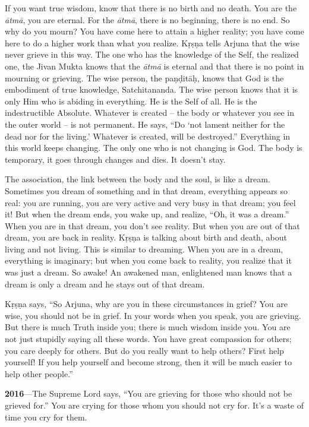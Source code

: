 If you want true wisdom, know that there is no birth and no death. You are the \textit{ātmā}, you are eternal. For the \textit{ātmā}, there is no beginning, there is no end. So why do you mourn? You have come here to attain a higher reality; you have come here to do a higher work than what you realize. Kṛṣṇa tells Arjuna that the wise never grieve in this way. The one who has the knowledge of the Self, the realized one, the Jivan Mukta knows that the \textit{ātmā} is eternal and that there is no point in mourning or grieving. The wise person, the paṇḍitāḥ, knows that God is the embodiment of true knowledge, Satchitananda. The wise person knows that it is only Him who is abiding in everything. He is the Self of all. He is the indestructible Absolute. Whatever is created – the body or whatever you see in the outer world – is not permanent. He says, “Do ‘not lament neither for the dead nor for the living.’ Whatever is created, will be destroyed.” Everything in this world keeps changing. The only one who is not changing is God. The body is temporary, it goes through changes and dies. It doesn’t stay.

The association, the link between the body and the soul, is like a dream. Sometimes you dream of something and in that dream, everything appears so real: you are running, you are very active and very busy in that dream; you feel it! But when the dream ends, you wake up, and realize, “Oh, it was a dream.” When you are in that dream, you don’t see reality. But when you are out of that dream, you are back in reality. Kṛṣṇa is talking about birth and death, about living and not living. This is similar to dreaming. When you are in a dream, everything is imaginary; but when you come back to reality, you realize that it was just a dream. So awake! An awakened man, enlightened man knows that a dream is only a dream and he stays out of that dream.

Kṛṣṇa says, “So Arjuna, why are you in these circumstances in grief? You are wise, you should not be in grief. In your words when you speak, you are grieving. But there is much Truth inside you; there is much wisdom inside you. You are not just stupidly saying all these words. You have great compassion for others; you care deeply for others. But do you really want to help others? First help yourself! If you help yourself and become strong, then it will be much easier to help other people.”

\textbf{2016}---The Supreme Lord says, “You are grieving for those who should not be grieved for.” You are crying for those whom you should not cry for. It’s a waste of time you cry for them.


